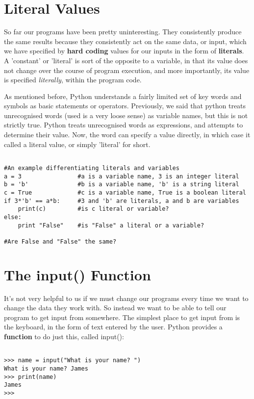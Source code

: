 
\section{Literal Values}

So far our programs have been pretty uninteresting. They     consistently produce the same results because they consistently act on     the same data, or input, which we have specified by \textbf{hard       coding} values for our inputs in the form of     \textbf{literals}. A 'constant' or 'literal' is sort of the opposite to a     variable, in that its value does not change over the course of program     execution, and more importantly, its value is specified     \textit{literally}, within the program code.

As mentioned before, Python understands a fairly limited set of key     words and symbols as basic statements or operators. Previously, we     said that python treats unrecognised words (used is a very loose sense)     as variable names, but this is not strictly true. Python treats     unrecognised words as expressions, and attempts to determine their     value. Now, the word can specify a value directly, in which case it     called a literal value, or simply 'literal' for short. 
\begin{lstlisting}

#An example differentiating literals and variables
a = 3                #a is a variable name, 3 is an integer literal
b = 'b'              #b is a variable name, 'b' is a string literal
c = True             #c is a variable name, True is a boolean literal
if 3*'b' == a*b:     #3 and 'b' are literals, a and b are variables
    print(c)         #is c literal or variable?
else:                
    print "False"    #is "False" a literal or a variable?

#Are False and "False" the same?
\end{lstlisting}

\section{The input() Function}

It's not very helpful to us if we must change our programs every     time we want to change the data they work with. So instead we want to     be able to tell our program to get input from somewhere. The simplest     place to get input from is the keyboard, in the form of text entered by     the user. Python provides a \textbf{function} to do just this,     called input():
\begin{lstlisting}

>>> name = input("What is your name? ")
What is your name? James
>>> print(name)
James
>>>
\end{lstlisting}

